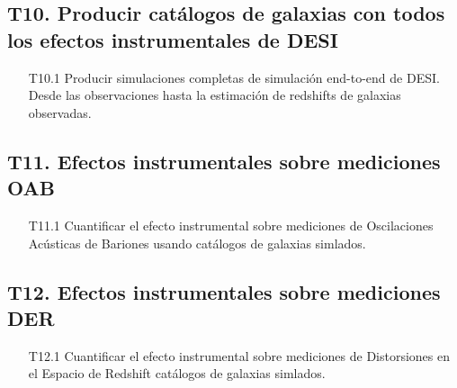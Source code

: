 \subsection*{T10. Producir cat\'alogos de galaxias con todos los
  efectos instrumentales de DESI}
\begin{itemize}
\item[T10.1] \gradB\prof Producir simulaciones completas de
  simulaci\'on end-to-end de DESI. Desde las observaciones hasta la
  estimaci\'on de redshifts de galaxias observadas. 
\end{itemize}

\subsection*{T11. Efectos instrumentales sobre mediciones OAB}
\begin{itemize}
\item[T11.1] \gradB Cuantificar el efecto instrumental sobre
  mediciones de Oscilaciones Ac\'usticas de Bariones usando
  cat\'alogos de galaxias simlados.
\end{itemize}

\subsection*{T12. Efectos instrumentales sobre mediciones DER}
\begin{itemize}
\item[T12.1] \gradB Cuantificar el efecto instrumental sobre
  mediciones de Distorsiones en el Espacio de Redshift
  cat\'alogos de galaxias simlados.
\end{itemize}


